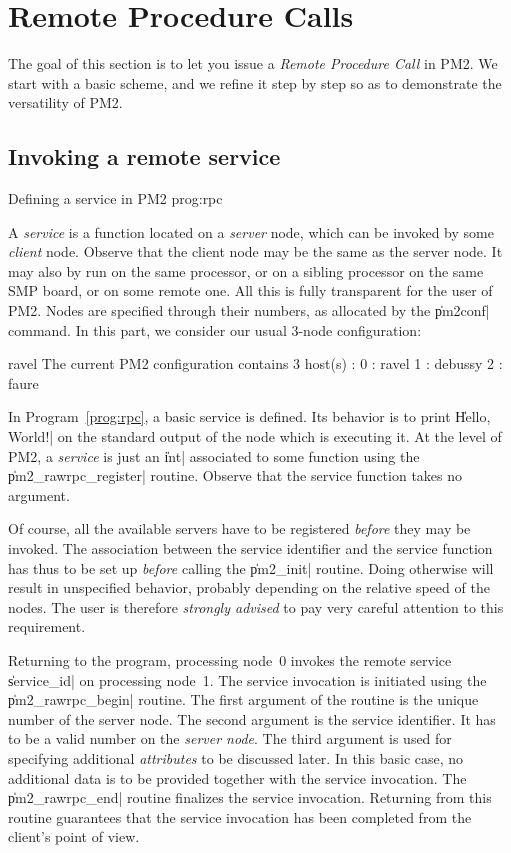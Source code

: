 \section{Remote Procedure Calls}

The goal of this section is to let you issue a \emph{Remote Procedure
  Call} in PM2. We start with a basic scheme, and we refine it step by
  step so as to demonstrate the versatility of PM2.

\subsection{Invoking a remote service}

 {Defining a service in PM2} {prog:rpc}

A \emph{service} is a function located on a \emph{server} node, which
can be invoked by some \emph{client} node. Observe that the client
node may be the same as the server node. It may also by run on the
same processor, or on a sibling processor on the same SMP board, or on
some remote one. All this is fully transparent for the user of PM2.
Nodes are specified through their numbers, as allocated by the
\|pm2conf| command. In this part, we consider our usual 3-node
configuration:
\begin{shell}
ravel%
The current PM2 configuration contains 3 host(s) :
0 : ravel
1 : debussy
2 : faure
\end{shell}

In Program~\ref{prog:rpc}, a basic service is defined. Its behavior is
to print \|Hello, World!| on the standard output of the node which is
executing it. At the level of PM2, a \emph{service} is just an \|int|
associated to some function using the \|pm2_rawrpc_register| routine.
Observe that the service function takes no argument.

Of course, all the available servers have to be registered
\emph{before} they may be invoked. The association between the service
identifier and the service function has thus to be set up
\emph{before} calling the \|pm2_init| routine. Doing otherwise will
result in unspecified behavior, probably depending on the relative
speed of the nodes. The user is therefore \emph{strongly advised} to
pay very careful attention to this requirement.

Returning to the program, processing node~0 invokes the remote service
\|service_id| on processing node~1. The service invocation is
initiated using the \|pm2_rawrpc_begin| routine.  The first
argument of the routine is the unique number of the server node.  The
second argument is the service identifier. It has to be a valid number
on the \emph{server node}.  The third argument is used for specifying
additional \emph{attributes} to be discussed later. In this basic
case, no additional data is to be provided together with the service
invocation. The \|pm2_rawrpc_end| routine finalizes the service
invocation. Returning from this routine guarantees that the service
invocation has been completed from the client's point of view.

